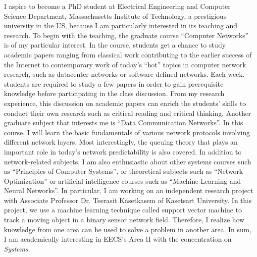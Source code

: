 \documentclass[a4paper,10pt]{report}
\newcommand{\university}{Massachusetts Institute of Technology}
\newcommand{\department}{Electrical Engineering and Computer Science Department}
\begin{document}
\vspace{0.2cm}
I aspire to become a PhD student at \department, \university, a prestigious university in the US, because I am particularly interested in its teaching and research. To begin with the teaching, the graduate course ``Computer Networks'' is of my particular interest. In the course, students get a chance to study academic papers ranging from classical work contributing to the earlier success of the Internet to contemporary work of today's ``hot'' topics in computer network research, such as datacenter networks or software-defined networks. Each week, students are required to study a few papers in order to gain prerequisite knowledge before participating in the class discussion. From my research experience, this discussion on academic papers can enrich the students' skills to conduct their own research such as critical reading and critical thinking. Another graduate subject that interests me is ``Data Communication Networks''. In this course, I will learn the basic fundamentals of various network protocols involving different network layers. Most interestingly, the queuing theory that plays an important role in today's network predictability is also covered. In addition to network-related subjects, I am also enthusiastic about other systems courses such as ``Principles of Computer Systems'', or theoretical subjects such as ``Network Optimization'' or artificial intelligence courses such as ``Machine Learning and Neural Networks''. In particular, I am working on an independent research project with Associate Professor Dr. Teerasit Kasetkasem of Kasetsart University. In this project, we use a machine learning technique called support vector machine to track a moving object in a binary sensor network field. Therefore, I realize how knowledge from one area can be used to solve a problem in another area. In sum, I am academically interesting in EECS's Area II with the concentration on \textit{Systems}.
\end{document}
